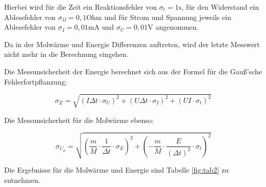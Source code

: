 \noindent Hierbei wird für die Zeit ein Reaktionsfehler von \(\sigma_t=1\text{s}\), für den Widerstand ein Ablesefehler von \(\sigma_\Omega=0,1\text{Ohm}\) und für Strom und Spannung jeweils ein Ablesefehler von \(\sigma_I=0,01\text{mA}\) und \(\sigma_U=0,01\text{V}\) angenommen.

\noindent Da in der Molwärme und Energie Differenzen auftreten, wird der letzte Messwert nicht mehr in die Berechnung eingehen.

\noindent Die Messunsicherheit der Energie berechnet sich aus der Formel für die Gauß'sche Fehlerfortpflanzung:

\begin{equation}
\sigma_E=\sqrt{(I\Delta t\cdot\sigma_U)^2 + (U\Delta t\cdot\sigma_I)^2 + (UI\cdot\sigma_t)^2}
\end{equation}

\noindent Die Messunsicherheit für die Molwärme ebenso:

\begin{equation}
\sigma_{C_p}=\sqrt{(\frac mM\cdot\frac{1}{\Delta t}\cdot\sigma_E)^2 + (-\frac mM\cdot\frac{E}{(\Delta t)^2}\cdot\sigma_t)^2 }
\end{equation}

\noindent Die Ergebnisse für die Molwärme und Energie sind Tabelle \ref{fig:tab2} zu entnehmen.

